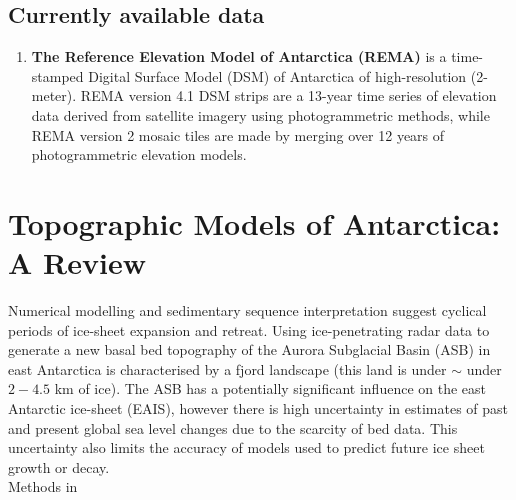 \subsection*{Currently available data}\label{data}
\begin{enumerate}
\item \textbf{The Reference Elevation Model of Antarctica (REMA)} is a time-stamped Digital Surface Model (DSM) of Antarctica of high-resolution (2-meter). REMA version 4.1 DSM strips are a 13-year time series of elevation data derived from satellite imagery using photogrammetric methods\cite{strips_2022}, while REMA version 2 mosaic tiles are made by merging over 12 years of photogrammetric elevation models\cite{mosaics_2022}. 
\end{enumerate}


\section*{Topographic Models of Antarctica: A Review}\label{review}
Numerical modelling and sedimentary sequence interpretation suggest cyclical periods of ice-sheet expansion and retreat\cite{Young_2011}. Using ice-penetrating radar data to generate a new basal bed topography of the Aurora Subglacial Basin (ASB) in east Antarctica is characterised by a fjord landscape (this land is under $\sim$ under $2-4.5$ km of ice). The ASB has a potentially significant influence on the east Antarctic ice-sheet (EAIS), however there is high uncertainty in estimates of past and present global sea level changes due to the scarcity of bed data\cite{Young_2011}. This uncertainty also limits the accuracy of models used to predict future ice sheet growth or decay.\\
{\large Methods in\cite{Young_2011}}
